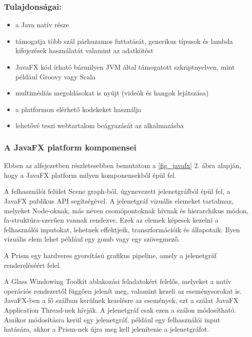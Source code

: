 \subsubsection*{Tulajdonságai:}
\begin{itemize}
\item a Java natív része 
\item támogatja több szál párhuzamos futtatását, generikus típusok és lambda kifejezések használatát valamint az adatkötést 
\item JavaFX kód írható bármilyen JVM által támogatott szkriptnyelven, mint például Groovy vagy Scala 
\item multimédiás megoldásokat is nyújt (videók és hangok lejátszása) 
\item a platformon elérhető kodekeket használja 
\item lehetővé teszi webtartalom beágyazását az alkalmazásba
\end{itemize}

\subsubsection*{A JavaFX platform komponensei}

Ebben az alfejezetben részletesebben bemutatom a \ref{fig_javafx} 2. ábra alapján, hogy a JavaFX platform milyen komponensekből épül fel. \cite{javafx}\cite{javafx4}



A felhasználói felület Scene graph-ból, úgynevezett jelenetgráfból épül fel, a JavaFX publikus API segítségével.
A jelenetgráf vizuális elemeket tartalmaz, melyeket Node-oknak, más néven csomópontoknak hívnak és hierarchikus módon, fa-struktúra-szerűen vannak rendezve.
Ezek az elemek képesek kezelni a felhasználói inputokat, lehetnek effektjeik, transzformációik és állapotaik.
Ilyen vizuális elem lehet például egy gomb vagy egy szövegmező. 

A Prism egy hardveres gyorsítású grafikus pipeline, amely a jelenetgráf rendereléséért felel.\cite{javafx2}

A Glass Windowing Toolkit ablakozási feladatokért felelős, melyeket a natív operációs rendszertől függően jelenít meg, valamint kezeli az eseménysorokat is.
JavaFX-ben a fő szálban kerülnek kezelésre az események, ezt a szálat JavaFX Application Thread-nek hívják.
A jelenetgráf csak ezen a szálon módosítható.
Amikor módosításra kerül egy jelenetgráf, például egy felhasználói input hatására, akkor a Prism-nek újra meg kell jelenítenie a jelenetgráfot.

